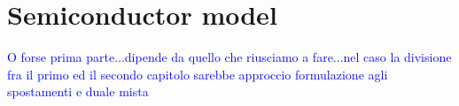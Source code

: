\chapter{Semiconductor model}

\textcolor{blue}{O forse prima parte...dipende da quello che riusciamo a fare...nel caso la divisione fra il primo ed il secondo capitolo sarebbe approccio formulazione agli spostamenti e duale mista}



\clearpage



\clearpage

